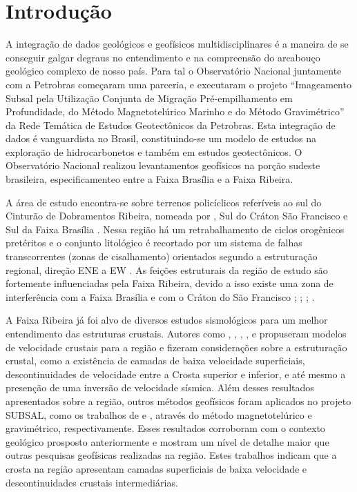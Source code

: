 \chapter{Introdução}

A integração de dados geológicos e geofísicos multidisciplinares é a maneira de se conseguir galgar degraus no entendimento e na compreensão do arcabouço geológico complexo de nosso país. Para tal o Observatório Nacional juntamente com a Petrobras começaram uma parceria, e executaram o projeto “Imageamento Subsal pela Utilização Conjunta de Migração Pré-empilhamento em Profundidade, do Método Magnetotelúrico Marinho e do Método Gravimétrico” da Rede Temática de Estudos Geotectônicos da Petrobras. Esta integração de dados é vanguardista no Brasil, constituindo-se um modelo de estudos na exploração de hidrocarbonetos e também em estudos geotectônicos. O Observatório Nacional realizou levantamentos geofísicos na porção sudeste brasileira, especificamenteo entre a Faixa Brasília e a Faixa Ribeira. 

A área de estudo encontra-se sobre terrenos policíclicos referíveis ao sul do Cinturão de Dobramentos Ribeira, nomeada por \cite{Riccomini_1989}, Sul do Cráton São Francisco e Sul da Faixa Brasília \citep{Almeida_Carneiro_1998}. Nessa região há um retrabalhamento de ciclos orogênicos pretéritos e o conjunto litológico é recortado por um sistema de falhas transcorrentes (zonas de cisalhamento) orientados segundo a estruturação regional, direção ENE a EW  \citep{Hasui_Sadowski_1976}. As feições estruturais da região de estudo são fortemente influenciadas pela Faixa Ribeira, devido a isso existe uma zona de interferência com a Faixa Brasília e com o Cráton do São Francisco \citep{kuhn_metamorphic_2004}; \citep{heilbron_evolution_2010}; \citep{valeriano_u_pb_2011}; \citep{heilbron_serra_2013}.

A Faixa Ribeira já foi alvo de diversos estudos sismológicos para um melhor entendimento das estruturas crustais. Autores como \cite{Bassini_1986}, \cite{souza_crustal_1991}, \cite{souza_shear-wave_1995}, \cite{assumpcao_crustal_2002}, \cite{dias_cario_crustal_2006} e \cite{sand_franca_crustal_2004} propuseram modelos de velocidade crustais para a região e fizeram considerações sobre a estruturação crustal, como a existência de camadas de baixa velocidade superficiais, descontinuidades de velocidade entre a Crosta superior e inferior, e até mesmo a presenção de uma inversão de velocidade sísmica. Além desses resultados apresentados sobre a região, outros métodos geofísicos foram aplicados no projeto SUBSAL, como os trabalhos de \cite{flora_solon_ancient_2013} e \cite{Silva_2014}, através do método magnetotelúrico e gravimétrico, respectivamente. Esses resultados corroboram com o contexto geológico prosposto anteriormente e mostram um nível de detalhe maior que outras pesquisas geofísicas realizadas na região. Estes trabalhos indicam que a crosta na região apresentam camadas superficiais de baixa velocidade e descontinuidades crustais intermediárias.

